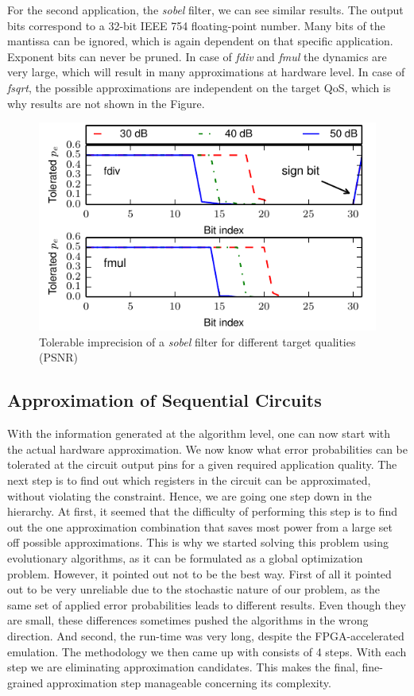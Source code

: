 \documentclass[10pt,twocolumn]{IEEEtran} %
\begin{document}
For the second application, the \emph{sobel} filter, we can see similar results. The output bits correspond to a 32-bit IEEE 754 floating-point number. Many bits of the mantissa can be ignored, which is again dependent on that specific application. Exponent bits can never be pruned. In case of \emph{fdiv} and \emph{fmul} the dynamics are very large, which will result in many approximations at hardware level. In case of \emph{fsqrt}, the possible approximations are independent on the target QoS, which is why results are not shown in the Figure.
\begin{figure}[tb]
  \centering
  \includegraphics[width=.48\textwidth]{figs/metrics_sobel}
  \caption{Tolerable imprecision of a \emph{sobel} filter for different target qualities (PSNR)}
  \label{fig:metrics_sobel}
\end{figure}


\subsection{\bf{Approximation of Sequential Circuits}}
\label{subsec:approximation}
With the information generated at the algorithm level, one can now start with the actual hardware approximation. We now know what error probabilities can be tolerated at the circuit output pins for a given required application quality. The next step is to find out which registers in the circuit can be approximated, without violating the constraint. Hence, we are going one step down in the hierarchy. At first, it seemed that the difficulty of performing this step is to find out the one approximation combination that saves most power from a large set off possible approximations. This is why we started solving this problem using evolutionary algorithms, as it can be formulated as a global optimization problem. However, it pointed out not to be the best way. First of all it pointed out to be very unreliable due to the stochastic nature of our problem, as the same set of applied error probabilities leads to different results. Even though they are small, these differences sometimes pushed the algorithms in the wrong direction. And second, the run-time was very long, despite the FPGA-accelerated emulation. The methodology we then came up with consists of 4 steps. With each step we are eliminating approximation candidates. This makes the final, fine-grained approximation step manageable concerning its complexity.
\end{document}
